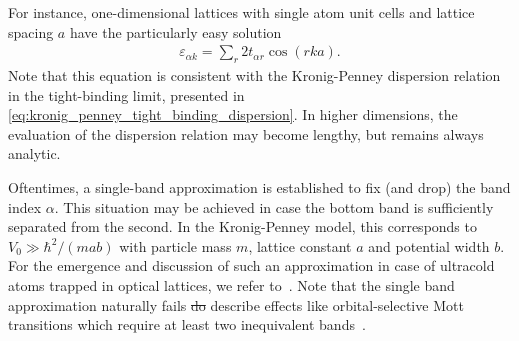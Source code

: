 \documentclass{svmono}
\providecommand{\DIFaddtex}[1]{{\protect\color{blue}\uwave{#1}}} %
\providecommand{\DIFdeltex}[1]{{\protect\color{red}\sout{#1}}}                      %
\providecommand{\DIFaddbegin}{} %
\providecommand{\DIFaddend}{} %
\providecommand{\DIFdelbegin}{} %
\providecommand{\DIFdelend}{} %
\providecommand{\DIFadd}[1]{\texorpdfstring{\DIFaddtex{#1}}{#1}} %
\providecommand{\DIFdel}[1]{\texorpdfstring{\DIFdeltex{#1}}{}} %
\newcommand{\DIFscaledelfig}{0.5}
\newlength{\DIFdelgraphicswidth} %
\newlength{\DIFdelgraphicsheight} %
\newcommand{\DIFaddincludegraphics}[2][]{{\color{blue}\fbox{\DIFOincludegraphics[#1]{#2}}}} %
\newcommand{\DIFdelincludegraphics}[2][]{%
\sbox{\DIFdelgraphicsbox}{\DIFOincludegraphics[#1]{#2}}%
\settoboxwidth{\DIFdelgraphicswidth}{\DIFdelgraphicsbox} %
\settoboxtotalheight{\DIFdelgraphicsheight}{\DIFdelgraphicsbox} %
\scalebox{\DIFscaledelfig}{%
\parbox[b]{\DIFdelgraphicswidth}{\usebox{\DIFdelgraphicsbox}\\[-\baselineskip] \rule{\DIFdelgraphicswidth}{0em}}\llap{\resizebox{\DIFdelgraphicswidth}{\DIFdelgraphicsheight}{%
\setlength{\unitlength}{\DIFdelgraphicswidth}%
\begin{picture}(1,1)%
\thicklines\linethickness{2pt} %
{\color[rgb]{1,0,0}\put(0,0){\framebox(1,1){}}}%
{\color[rgb]{1,0,0}\put(0,0){\line( 1,1){1}}}%
{\color[rgb]{1,0,0}\put(0,1){\line(1,-1){1}}}%
\end{picture}%
}\hspace*{3pt}}} %
} %
\DeclareRobustCommand{\DIFaddbegin}{\DIFOaddbegin \let\includegraphics\DIFaddincludegraphics} %
\DeclareRobustCommand{\DIFaddend}{\DIFOaddend \let\includegraphics\DIFOincludegraphics} %
\DeclareRobustCommand{\DIFdelbegin}{\DIFOdelbegin \let\includegraphics\DIFdelincludegraphics} %
\DeclareRobustCommand{\DIFdelend}{\DIFOaddend \let\includegraphics\DIFOincludegraphics} %
\begin{document}
For instance, one-dimensional lattices with single atom unit cells and lattice spacing $a$ have the particularly easy solution
\begin{align}
    \varepsilon_{\alpha k} = \sum_r 2t_{\alpha r}\cos(r ka).
    \label{eq:1D_tight_binding_dispersion}
\end{align}
Note that this equation is consistent with the Kronig-Penney dispersion relation in the tight-binding limit, presented in \cref{eq:kronig_penney_tight_binding_dispersion}.
In higher dimensions, the evaluation of the dispersion relation may become lengthy, but remains always analytic.

Oftentimes, a single-band approximation is established to fix (and drop) the band index $\alpha$.
This situation may be achieved in case the bottom band is sufficiently separated from the second.
In the Kronig-Penney model, this corresponds to $V_0\gg \hbar^2/(mab)$ with particle mass $m$, lattice constant $a$ and potential width \DIFdelbegin \DIFdel{$b$}\DIFdelend \DIFaddbegin \DIFadd{$b\ll a$}\DIFaddend .
For the emergence and discussion of such an approximation in case of ultracold atoms trapped in optical lattices, we refer to~\cite{Jaksch1998,Bloch2008,Buechler2010,Mazza2012}.
Note that the single band approximation naturally fails \DIFdelbegin \DIFdel{do }\DIFdelend \DIFaddbegin \DIFadd{to }\DIFaddend describe effects like orbital-selective Mott transitions which require at least two inequivalent bands~\cite{Anisimov2002,vanDongen2005}.
\end{document}
